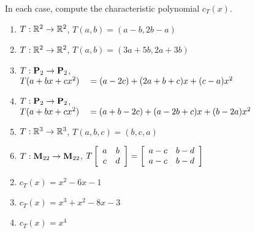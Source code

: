 \begin{multicols}{2}
\begin{ex}
In each case, compute the characteristic polynomial $c_{T}(x)$.


\begin{enumerate}[label={\alph*.}]
\item $T : \mathbb{R}^2 \to \mathbb{R}^2$, $T(a, b) = (a - b, 2b - a)$

\item $T : \mathbb{R}^2 \to \mathbb{R}^2$, $T(a, b) = (3a + 5b, 2a + 3b)$

\item $T : \textbf{P}_{2} \to \textbf{P}_{2}$, \\ $T(a + bx + cx^{2}) \\ \hspace*{1em}= (a - 2c) + (2a + b + c)x + (c - a)x^{2}$

\item $T : \textbf{P}_{2} \to \textbf{P}_{2}$, \\ $T(a + bx + cx^{2}) \\ \hspace*{1em}= (a + b - 2c) + (a - 2b + c)x + (b - 2a)x^{2}$

\item $T : \mathbb{R}^3 \to \mathbb{R}^3$, $T(a, b, c) = (b, c, a)$

\item $T : \textbf{M}_{22} \to \textbf{M}_{22}$, $T \left[ \begin{array}{cc} a & b \\ c & d \end{array} \right] = \left[ \begin{array}{cc} a - c & b - d \\ a - c & b - d \end{array} \right]$

\end{enumerate}
\begin{sol}
\begin{enumerate}[label={\alph*.}]
\setcounter{enumi}{1}
\item $c_{T}(x) = x^{2} - 6x - 1$

\setcounter{enumi}{3}
\item $c_{T}(x) = x^{3} + x^{2} - 8x - 3$

\setcounter{enumi}{5}
\item $c_{T}(x) = x^{4}$

\end{enumerate}
\end{sol}
\end{ex}


\end{multicols}
